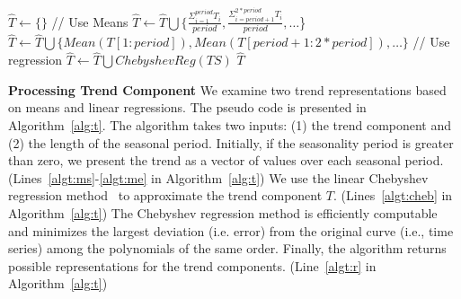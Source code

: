 \documentclass{sigmod}
\begin{document}
 

\begin{algorithm}[tp]
\caption{Find Possible Representations for Trend}
\label{alg:t}
\begin{algorithmic}[1]
\State $\hat{T} \gets  \{\}$
  \label{algt:ms}
\State // Use Means
\State $\hat{T} \gets \hat{T} \bigcup \{ \frac{\Sigma_{i=1}^{period} {T_i}}{period}, \frac{\Sigma_{i=period+1}^{2*period} {T_i}}{period}, \dots $\}
\State $\hat{T} \gets \hat{T} \bigcup  \{ Mean(T[1:period]), Mean(T[period+1:2*period]),  \dots \} $
\EndIf  \label{algt:me}
\State // Use regression
\State $\hat{T} \gets \hat{T} \bigcup ChebyshevReg(TS)$ \label{algt:cheb}
 $\hat{T}$\label{algt:r}
\EndProcedure
\end{algorithmic}
\end{algorithm}

{\bf Processing Trend Component}
\label{sec:nonseasonal}
We examine two  trend representations based on means and linear regressions. The pseudo code is presented in Algorithm~\ref{alg:t}. The algorithm takes two inputs: (1) the trend component and (2) the length of the seasonal period. Initially, if the seasonality period is greater than zero,  we present the trend as a vector of  values over each seasonal period. (Lines~\ref{algt:ms}-\ref{algt:me} in Algorithm~\ref{alg:t}) 
We use  the linear Chebyshev regression method~\cite{cheb} to approximate the trend component $T$. (Lines~\ref{algt:cheb} in Algorithm~\ref{alg:t}) The Chebyshev regression method is efficiently computable and 
minimizes the largest deviation (i.e. error) from the original curve (i.e., time series) among the polynomials of the same order. Finally, the algorithm returns possible representations for the trend components. (Line~\ref{algt:r} in Algorithm~\ref{alg:t})
\end{document}
